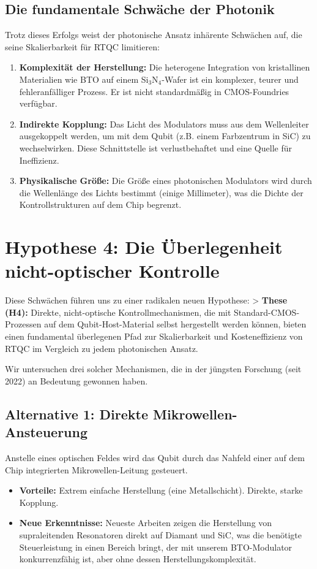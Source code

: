 \documentclass[12pt, a4paper, numbers]{report}
\begin{document}
\section{Die fundamentale Schwäche der Photonik}
Trotz dieses Erfolgs weist der photonische Ansatz inhärente Schwächen auf, die seine Skalierbarkeit für RTQC limitieren:
\begin{enumerate}
    \item \textbf{Komplexität der Herstellung:} Die heterogene Integration von kristallinen Materialien wie BTO auf einem Si$_3$N$_4$-Wafer ist ein komplexer, teurer und fehleranfälliger Prozess. Er ist nicht standardmäßig in CMOS-Foundries verfügbar.
    \item \textbf{Indirekte Kopplung:} Das Licht des Modulators muss aus dem Wellenleiter ausgekoppelt werden, um mit dem Qubit (z.B. einem Farbzentrum in SiC) zu wechselwirken. Diese Schnittstelle ist verlustbehaftet und eine Quelle für Ineffizienz.
    \item \textbf{Physikalische Größe:} Die Größe eines photonischen Modulators wird durch die Wellenlänge des Lichts bestimmt (einige Millimeter), was die Dichte der Kontrollstrukturen auf dem Chip begrenzt.
\end{enumerate}

\chapter{Hypothese 4: Die Überlegenheit nicht-optischer Kontrolle}
Diese Schwächen führen uns zu einer radikalen neuen Hypothese:
> \textbf{These (H4):} Direkte, nicht-optische Kontrollmechanismen, die mit Standard-CMOS-Prozessen auf dem Qubit-Host-Material selbst hergestellt werden können, bieten einen fundamental überlegenen Pfad zur Skalierbarkeit und Kosteneffizienz von RTQC im Vergleich zu jedem photonischen Ansatz.

Wir untersuchen drei solcher Mechanismen, die in der jüngsten Forschung (seit 2022) an Bedeutung gewonnen haben.

\section{Alternative 1: Direkte Mikrowellen-Ansteuerung}
Anstelle eines optischen Feldes wird das Qubit durch das Nahfeld einer auf dem Chip integrierten Mikrowellen-Leitung gesteuert.
\begin{itemize}
    \item \textbf{Vorteile:} Extrem einfache Herstellung (eine Metallschicht). Direkte, starke Kopplung.
    \item \textbf{Neue Erkenntnisse:} Neueste Arbeiten zeigen die Herstellung von supraleitenden Resonatoren direkt auf Diamant und SiC, was die benötigte Steuerleistung in einen Bereich bringt, der mit unserem BTO-Modulator konkurrenzfähig ist, aber ohne dessen Herstellungskomplexität.
\end{itemize}
\end{document}
